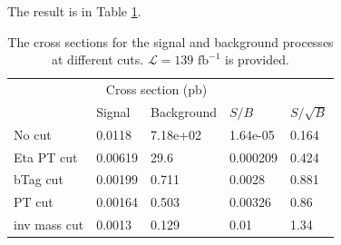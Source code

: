 \documentclass[12pt]{article}
\begin{document}
	The result is in Table \ref{tab:signal_background_analysis}.

	\begin{table}[htpb]
		\centering
		\caption{The cross sections for the signal and background processes at different cuts. $\mathcal{L} = 139 \text{ fb}^{-1}$ is provided.}
		\label{tab:signal_background_analysis}
		\begin{tabular}{l|ll|ll}
						 & \multicolumn{2}{|c|}{Cross section (pb)} &            &             \\
						 & Signal          & Background      & $S / B$        & $S / \sqrt{B}$ \\
			\hline 	
			No cut       & 0.0118         & 7.18e+02         & 1.64e-05 & 0.164       \\
			Eta PT cut   & 0.00619        & 29.6             & 0.000209 & 0.424       \\
			bTag cut     & 0.00199        & 0.711            & 0.0028   & 0.881       \\
			PT cut       & 0.00164        & 0.503            & 0.00326  & 0.86        \\
			inv mass cut & 0.0013         & 0.129            & 0.01     & 1.34       
			\end{tabular}
	\end{table}


\end{document}
